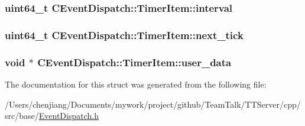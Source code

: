 \subsubsection[{interval}]{\setlength{\rightskip}{0pt plus 5cm}uint64\+\_\+t C\+Event\+Dispatch\+::\+Timer\+Item\+::interval}\label{struct_c_event_dispatch_1_1_timer_item_ab049cb99bfd5a4927f7c39e99e121c5b}
\hypertarget{struct_c_event_dispatch_1_1_timer_item_acd964e96fe7a860eb05a793aecc47b08}{}
\subsubsection[{next\+\_\+tick}]{\setlength{\rightskip}{0pt plus 5cm}uint64\+\_\+t C\+Event\+Dispatch\+::\+Timer\+Item\+::next\+\_\+tick}\label{struct_c_event_dispatch_1_1_timer_item_acd964e96fe7a860eb05a793aecc47b08}
\hypertarget{struct_c_event_dispatch_1_1_timer_item_a56adca3c8753438e2b469ab3d6a5354a}{}
\subsubsection[{user\+\_\+data}]{\setlength{\rightskip}{0pt plus 5cm}void $\ast$ C\+Event\+Dispatch\+::\+Timer\+Item\+::user\+\_\+data}\label{struct_c_event_dispatch_1_1_timer_item_a56adca3c8753438e2b469ab3d6a5354a}


The documentation for this struct was generated from the following file\+:\begin{DoxyCompactItemize}
\item 
/\+Users/chenjiang/\+Documents/mywork/project/github/\+Team\+Talk/\+T\+T\+Server/cpp/src/base/\hyperlink{base_2_event_dispatch_8h}{Event\+Dispatch.\+h}\end{DoxyCompactItemize}
